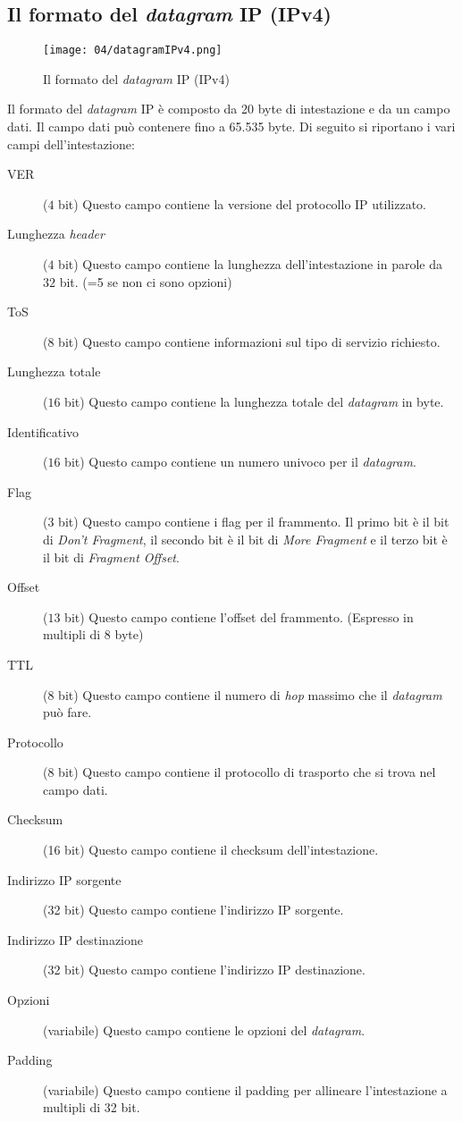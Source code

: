     \subsection[Il formato del \textit{datagram} \texttt{IP} (\texttt{IPv4})]{Il formato del \textit{datagram} \Acrshort*{IP} (\Acrshort*{IPv4})}
        \begin{figure}[H]
            \centering
            \texttt{[image: 04/datagramIPv4.png]}
            \caption{Il formato del \textit{datagram} \Acrshort*{IP} (\Acrshort*{IPv4})}
            \label{fig:IPv4Header}
        \end{figure}
        Il formato del \textit{datagram} \Acrshort*{IP} è composto da 20 byte di intestazione e da un campo dati. Il campo dati può contenere fino a 65.535 byte.  Di seguito si riportano i vari campi dell'intestazione:
        \begin{description}
            \item[VER] ($4$ bit) Questo campo contiene la versione del protocollo \Acrshort*{IP} utilizzato.
            \item[Lunghezza \textit{header}] ($4$ bit) Questo campo contiene la lunghezza dell'intestazione in parole da $32$ bit. (=5 se non ci sono opzioni)
            \item[\Acrfull*{ToS}] ($8$ bit) Questo campo contiene informazioni sul tipo di servizio richiesto.
            \item[Lunghezza totale] ($16$ bit) Questo campo contiene la lunghezza totale del \textit{datagram} in byte.
            \item[Identificativo] ($16$ bit) Questo campo contiene un numero univoco per il \textit{datagram}.
            \item[Flag] ($3$ bit) Questo campo contiene i flag per il frammento. Il primo bit è il bit di \textit{Don't Fragment}, il secondo bit è il bit di \textit{More Fragment} e il terzo bit è il bit di \textit{Fragment Offset}.
            \item[Offset] ($13$ bit) Questo campo contiene l'offset del frammento. (Espresso in multipli di $8$ byte)
            \item[\Acrfull*{TTL}] ($8$ bit) Questo campo contiene il numero di \textit{hop} massimo che il \textit{datagram} può fare.
            \item[Protocollo] (8 bit) Questo campo contiene il protocollo di trasporto che si trova nel campo dati.
            \item[Checksum] (16 bit) Questo campo contiene il checksum dell'intestazione.
            \item[Indirizzo \Acrshort*{IP} sorgente] (32 bit) Questo campo contiene l'indirizzo \Acrshort*{IP} sorgente.
            \item[Indirizzo \Acrshort*{IP} destinazione] (32 bit) Questo campo contiene l'indirizzo \Acrshort*{IP} destinazione.
            \item[Opzioni] (variabile) Questo campo contiene le opzioni del \textit{datagram}.
            \item[Padding] (variabile) Questo campo contiene il padding per allineare l'intestazione a multipli di 32 bit.
        \end{description}
